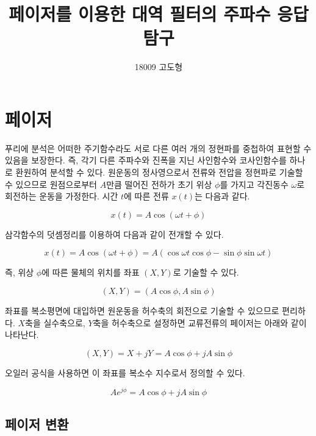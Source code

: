 \documentclass{article}
\begin{document}

\title{페이저를 이용한 대역 필터의 주파수 응답 탐구}
\author{18009 고도형}
\maketitle

\section{페이저}

푸리에 분석은 어떠한 주기함수라도 서로 다른 여러 개의 정현파를 중첩하여 표현할 수 있음을 보장한다. 즉, 각기 다른 주파수와 진폭을 지닌 사인함수와 코사인함수를 하나로 환원하여 분석할 수 있다. 원운동의 정사영으로서 전류와 전압을 정현파로 기술할 수 있으므로 원점으로부터 $A$만큼 떨어진 전하가 초기 위상 $\phi$를 가지고 각진동수 $\omega$로 회전하는 운동을 가정한다. 시간 $t$에 따른 전류 $x(t)$는 다음과 같다.

\begin{equation}
    x(t)=A \cos(\omega t+\phi)
\end{equation}

삼각함수의 덧셈정리를 이용하여 다음과 같이 전개할 수 있다.

\begin{equation}
    x(t)=A \cos(\omega t+\phi)=A(\cos\omega t\cos\phi-\sin\phi\sin\omega t)
\end{equation}

즉, 위상 $\phi$에 따른 물체의 위치를 좌표 $(X, Y)$로 기술할 수 있다.

\begin{equation}
    (X, Y)=(A\cos\phi, A\sin\phi)
\end{equation}

좌표를 복소평면에 대입하면 원운동을 허수축의 회전으로 기술할 수 있으므로 편리하다. $X$축을 실수축으로, $Y$축을 허수축으로 설정하면 교류전류의 페이저는 아래와 같이 나타난다.

\begin{equation}
    (X, Y)=X+jY=A\cos\phi+jA\sin\phi
\end{equation}

오일러 공식을 사용하면 이 좌표를 복소수 지수로서 정의할 수 있다.

\begin{equation}
    Ae^{j\phi}=A\cos\phi+jA\sin\phi
\end{equation}

\subsection{페이저 변환}
\end{document}
